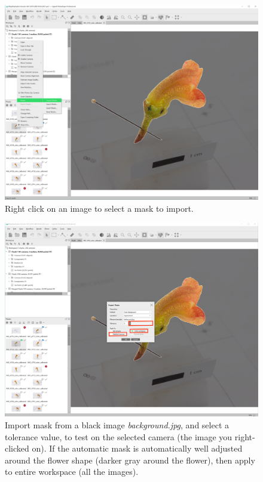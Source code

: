 \documentclass[
]{book}
\theoremstyle{definition}
\theoremstyle{definition}
\theoremstyle{definition}
\theoremstyle{definition}
\theoremstyle{remark}
\begin{document}
\begin{figure}
\centering
\includegraphics[width=1\textwidth,height=\textheight]{Figures/Metashape_mask_right_click.png}
\caption{Right click on an image to select a mask to
import.}
\end{figure}

\begin{figure}
\centering
\includegraphics[width=1\textwidth,height=\textheight]{Figures/Metashape_masks_tolerance.png}
\caption{Import mask from a black image \emph{background.jpg}, and select a
tolerance value, to test on the selected camera (the image you
right-clicked on). If the automatic mask is automatically well adjusted
around the flower shape (darker gray around the flower), then apply to
entire workspace (all the
images).}
\end{figure}
\end{document}
